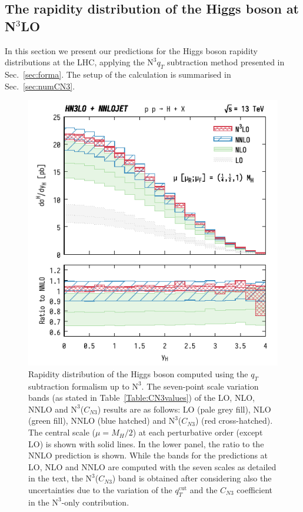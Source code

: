 \documentclass[12pt]{article}
\DeclareRobustCommand{\qt}{\ensuremath{q_T}\xspace}
\DeclareRobustCommand{\qtcut}{\ensuremath{q_T^\mathrm{cut}}\xspace}
\DeclareRobustCommand{\LO}{\text{LO}\xspace}
\DeclareRobustCommand{\N}[1]{\ensuremath{\text{N}^{#1}}} %
\begin{document}
\subsection{The rapidity distribution of the Higgs boson at \texorpdfstring{N${}^\text{3}$LO}{N3LO}}
\label{sec:results}

In this section we present our predictions for the Higgs boson rapidity distributions at the LHC, applying the \N3\LO $\qt$ subtraction method presented in Sec.~\ref{sec:forma}. The setup of the calculation is summarised in Sec.~\ref{sec:numCN3}. 

\begin{figure}[tbh]
\centering
\includegraphics[width=.6\linewidth]{./new_figures/yH_B02_best}
\caption{\label{fig:yHN3LO}{Rapidity distribution of the Higgs boson computed using the $\qt$ subtraction formalism up to \N3\LO. The seven-point scale variation bands (as stated in Table~\ref{Table:CN3values}) of the LO, NLO, NNLO and \N3\LO($C_{N3}$) results are as follows: LO (pale grey fill), NLO (green fill), NNLO (blue hatched) and \N3\LO($C_{N3}$) (red cross-hatched). The central scale ($\mu=M_{H}/2$) at each perturbative order (except LO) is shown with solid lines. In the lower panel, the ratio to the NNLO prediction is shown. While the bands for the predictions at LO, NLO and NNLO are computed with the seven scales as detailed in the text, the \N3\LO($C_{N3}$) band is obtained after considering also the uncertainties due to the variation of the $\qtcut$ and the $C_{N3}$ coefficient in the 
\N3\LO-only contribution.
}}
\end{figure}
\end{document}
